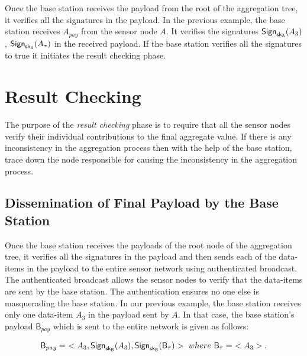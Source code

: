 	Once the base station receives the payload from the root of the aggregation tree, it verifies all the signatures in the payload.
	In the previous example, the base station receives $A_{pay}$ from the sensor node $A$.
	It verifies the signatures $\textsf{Sign}_{\sf{sk}_{A}}(A_{3})$, $\textsf{Sign}_{\sf{sk}_{A}}(A_{\tau})$ in the received payload.	 
	If the base station verifies all the signatures to true it initiates the result checking phase.

\section{Result Checking}
	The purpose of the \textit{result checking} phase is to require that all the sensor nodes verify their individual contributions to the final aggregate value.
	If there is any inconsistency in the aggregation process then with the help of the base station, trace down the node responsible for causing the inconsistency in the aggregation process.

	\subsection{Dissemination of Final Payload by the Base Station}
		Once the base station receives the payloads of the root node of the aggregation tree, it verifies all the signatures in the payload and then sends each of the data-items in the payload to the entire sensor network using authenticated broadcast.
		The authenticated broadcast allows the sensor nodes to verify that the data-items are sent by the base station. 
		The authentication ensures no one else is masquerading the base station.
		In our previous example, the base station receives only one data-item $A_{3}$ in the payload sent by $A$.
		In that case, the base station's payload $\textsf{B}_{pay}$ which is sent to the entire network is given as follows:
		
	 		\begin{equation*}
				\textsf{B}_{pay} =\ <A_{3}, \textsf{Sign}_{\sk_{\textsf{B}}}(A_{3}), \textsf{Sign}_{\sk_{\textsf{B}}}(\textsf{B}_{\tau})>\ where\ \textsf{B}_{\tau} =\ <A_{3}>.
			\end{equation*}
		
